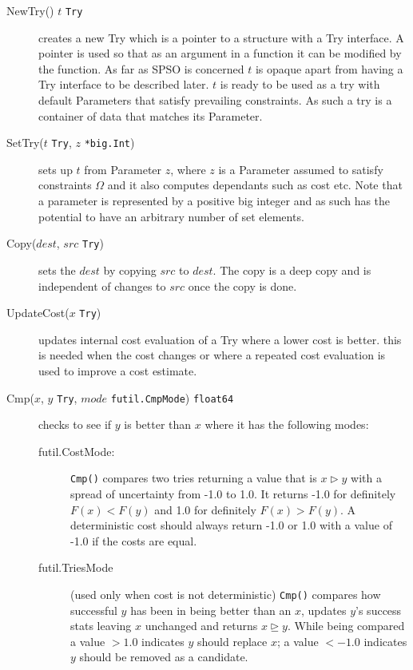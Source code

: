 \documentclass[a4paper,oneside,english]{book}
\numberwithin{equation}{section}
\numberwithin{figure}{section}
\begin{document}
\begin{description}
	
	\item[NewTry() $t$ \texttt{Try}]
	creates a new Try which is a pointer to a structure  with a Try interface. A pointer is used so that as an argument in a function it can be modified by the function. As far as SPSO is concerned $t$ is opaque apart from having a Try interface to be described later. $t$ is ready to be used as a try with default Parameters  that satisfy prevailing constraints. As such a try is a container of data that matches its Parameter. 
	
	\item[SetTry($t$ \texttt{Try}, $z$ \texttt{*big.Int}) ]
	sets up  $t$ from  Parameter $z$, where $z$ is a Parameter assumed to satisfy constraints $\Omega$ and it also computes dependants such as cost etc. Note that a parameter is represented by a positive big integer and as such has the potential to have an arbitrary number of set elements.   
	
	\item[Copy($dest$, $src$ \texttt{Try})]
	sets  the $dest$ by copying $src$ to $dest$. The copy is a deep copy  and is independent of changes to $src$ once the copy is done.

	\item[UpdateCost($x$ \texttt{Try})]
	updates internal cost evaluation of a Try where a lower cost is better.
	this is needed when the cost changes or where a repeated cost evaluation is used to improve a cost estimate.  

	
	\item[Cmp($x$, $y$ \texttt{Try}, $mode$ \texttt{futil.CmpMode}) \texttt{float64}]
	 checks to see if $y$ is better than $x$ where it has the following modes:
	\begin{description}
		\item[futil.CostMode:] 	\texttt{Cmp()} compares two tries returning a value that is $x \rhd y$ with a spread of uncertainty from -1.0 to 1.0. It returns -1.0 for
		definitely $F(x) < F(y)$  and 1.0 for definitely $F(x) > F(y)$.
		A deterministic cost should always return -1.0 or 1.0 with a value of
		-1.0 if the costs are equal.
		
		\item[futil.TriesMode] (used only when cost is not deterministic)
			\texttt{Cmp()} compares how successful  $y$  has been in being better than  an $x$,
		updates $y$'s success stats leaving $x$ unchanged and returns $x \unrhd y$.
		While being compared a value $> 1.0$ indicates $y$ should replace $x$; a value
		$< -1.0$ indicates $y$ should be removed as a candidate.
	\end{description}
	

\end{description}
\end{document}
